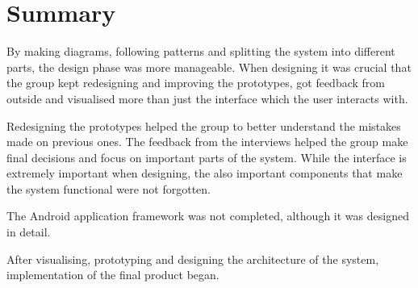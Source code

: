 \chapter{Summary}

By making diagrams, following patterns and splitting the system into different parts, the design phase was more manageable.
When designing it was crucial that the group kept redesigning and improving the prototypes, got feedback from outside and visualised more than just the interface which the user interacts with.

Redesigning the prototypes helped the group to better understand the mistakes made on previous ones.
The feedback from the interviews helped the group make final decisions and focus on important parts of the system.
While the interface is extremely important when designing, the also important components that make the system functional were not forgotten. 

The Android application framework was not completed, although it was designed in detail. 

After visualising, prototyping and designing the architecture of the system, implementation of the final product began.


